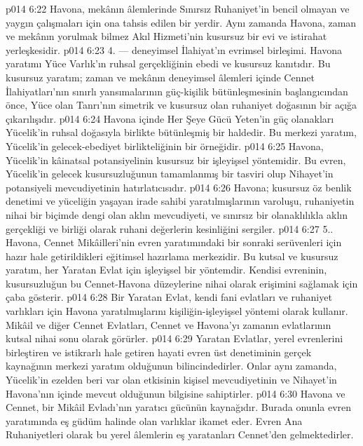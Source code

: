 \vs p014 6:22 Havona, mekânın âlemlerinde Sınırsız Ruhaniyet’in bencil olmayan ve yaygın çalışmaları için ona tahsis edilen bir yerdir. Aynı zamanda Havona, zaman ve mekânın yorulmak bilmez Akıl Hizmeti’nin kusursuz bir evi ve istirahat yerleşkesidir.
\vs p014 6:23 4.\bibnobreakspace {} --- deneyimsel İlahiyat’ın evrimsel birleşimi. Havona yaratımı Yüce Varlık’ın ruhsal gerçekliğinin ebedi ve kusursuz kanıtıdır. Bu kusursuz yaratım; zaman ve mekânın deneyimsel âlemleri içinde Cennet İlahiyatları’nın sınırlı yansımalarının güç\hyp{}kişilik bütünleşmesinin başlangıcından önce, Yüce olan Tanrı’nın simetrik ve kusursuz olan ruhaniyet doğasının bir açığa çıkarılışıdır.
\vs p014 6:24 Havona içinde Her Şeye Gücü Yeten’in güç olanakları Yücelik’in ruhsal doğasıyla birlikte bütünleşmiş bir haldedir. Bu merkezi yaratım, Yücelik’in gelecek\hyp{}ebediyet birlikteliğinin bir örneğidir.
\vs p014 6:25 Havona, Yücelik’in kâinatsal potansiyelinin kusursuz bir işleyişsel yöntemidir. Bu evren, Yücelik’in gelecek kusursuzluğunun tamamlanmış bir tasviri olup Nihayet’in potansiyeli mevcudiyetinin hatırlatıcısıdır.
\vs p014 6:26 Havona; kusursuz öz benlik denetimi ve yüceliğin yaşayan irade sahibi yaratılmışlarının varoluşu, ruhaniyetin nihai bir biçimde dengi olan aklın mevcudiyeti, ve sınırsız bir olanaklılıkla aklın gerçekliği ve birliği olarak ruhani değerlerin kesinliğini sergiler.
\vs p014 6:27 5.\bibnobreakspace {}. Havona, Cennet Mikâilleri’nin evren yaratımındaki bir sonraki serüvenleri için hazır hale getirildikleri eğitimsel hazırlama merkezidir. Bu kutsal ve kusursuz yaratım, her Yaratan Evlat için işleyişsel bir yöntemdir. Kendisi evreninin, kusursuzluğun bu Cennet\hyp{}Havona düzeylerine nihai olarak erişimini sağlamak için çaba gösterir.
\vs p014 6:28 Bir Yaratan Evlat, kendi fani evlatları ve ruhaniyet varlıkları için Havona yaratılmışlarını kişiliğin\hyp{}işleyişsel yöntemi olarak kullanır. Mikâil ve diğer Cennet Evlatları, Cennet ve Havona’yı zamanın evlatlarının kutsal nihai sonu olarak görürler.
\vs p014 6:29 Yaratan Evlatlar, yerel evrenlerini birleştiren ve istikrarlı hale getiren hayati evren üst denetiminin gerçek kaynağının merkezi yaratım olduğunun bilincindedirler. Onlar aynı zamanda, Yücelik’in ezelden beri var olan etkisinin kişisel mevcudiyetinin ve Nihayet’in Havona’nın içinde mevcut olduğunun bilgisine sahiptirler.
\vs p014 6:30 Havona ve Cennet, bir Mikâil Evladı’nın yaratıcı gücünün kaynağıdır. Burada onunla evren yaratımında eş güdüm halinde olan varlıklar ikamet eder. Evren Ana Ruhaniyetleri olarak bu yerel âlemlerin eş yaratanları Cennet’den gelmektedirler.

